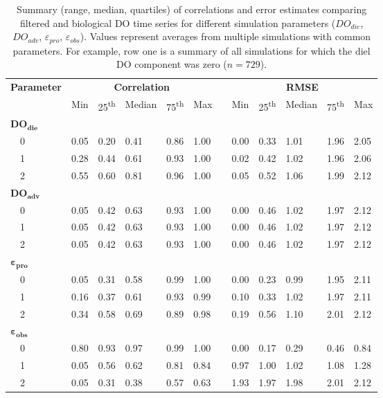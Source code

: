 \documentclass[letterpaper,12pt,oneside]{article}\usepackage[]{graphicx}\usepackage[]{color}
\begin{document}
\begin{table}[h]
\caption{Summary (range, median, quartiles) of correlations and error estimates comparing filtered and biological \ac{DO} time series for different simulation parameters ($DO_{die}$, $DO_{adv}$, $\varepsilon_{pro}$, $\varepsilon_{obs}$).  Values represent averages from multiple simulations with common parameters.  For example, row one is a summary of all simulations for which the diel \ac{DO} component was zero ($n=729$).\label{tab:dtd_perf1}} 
\begin{center}
\begin{tabular}{llllllclllll}
\hline\hline
\multicolumn{1}{l}{\bfseries Parameter}&\multicolumn{5}{c}{\bfseries Correlation}&\multicolumn{1}{c}{\bfseries }&\multicolumn{5}{c}{\bfseries RMSE}\tabularnewline
\cline{2-6} \cline{8-12}
\multicolumn{1}{l}{}&\multicolumn{1}{c}{Min}&\multicolumn{1}{c}{25\textsuperscript{th}}&\multicolumn{1}{c}{Median}&\multicolumn{1}{c}{75\textsuperscript{th}}&\multicolumn{1}{c}{Max}&\multicolumn{1}{c}{}&\multicolumn{1}{c}{Min}&\multicolumn{1}{c}{25\textsuperscript{th}}&\multicolumn{1}{c}{Median}&\multicolumn{1}{c}{75\textsuperscript{th}}&\multicolumn{1}{c}{Max}\tabularnewline
\hline
{\bfseries $\boldsymbol{DO_{die}}$}&&&&&&&&&&&\tabularnewline
~~0&0.05&0.20&0.41&0.86&1.00&&0.00&0.33&1.01&1.96&2.05\tabularnewline
~~1&0.28&0.44&0.61&0.93&1.00&&0.02&0.42&1.02&1.96&2.06\tabularnewline
~~2&0.55&0.60&0.81&0.96&1.00&&0.05&0.52&1.06&1.99&2.12\tabularnewline
\hline
{\bfseries $\boldsymbol{DO_{adv}}$}&&&&&&&&&&&\tabularnewline
~~0&0.05&0.42&0.63&0.93&1.00&&0.00&0.46&1.02&1.97&2.12\tabularnewline
~~1&0.05&0.42&0.63&0.93&1.00&&0.00&0.46&1.02&1.97&2.12\tabularnewline
~~2&0.05&0.42&0.63&0.93&1.00&&0.00&0.46&1.02&1.97&2.12\tabularnewline
\hline
{\bfseries $\boldsymbol{\varepsilon_{pro}}$}&&&&&&&&&&&\tabularnewline
~~0&0.05&0.31&0.58&0.99&1.00&&0.00&0.23&0.99&1.95&2.11\tabularnewline
~~1&0.16&0.37&0.61&0.93&0.99&&0.10&0.33&1.02&1.97&2.11\tabularnewline
~~2&0.34&0.58&0.69&0.89&0.98&&0.19&0.56&1.10&2.01&2.12\tabularnewline
\hline
{\bfseries $\boldsymbol{\varepsilon_{obs}}$}&&&&&&&&&&&\tabularnewline
~~0&0.80&0.93&0.97&0.99&1.00&&0.00&0.17&0.29&0.46&0.84\tabularnewline
~~1&0.05&0.56&0.62&0.81&0.84&&0.97&1.00&1.02&1.08&1.28\tabularnewline
~~2&0.05&0.31&0.38&0.57&0.63&&1.93&1.97&1.98&2.01&2.12\tabularnewline
\hline
\end{tabular}\end{center}

\end{table}
\end{document}
